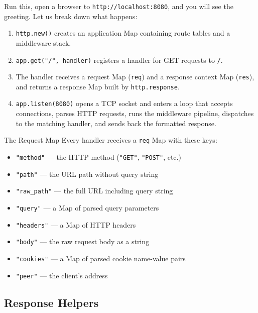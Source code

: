 Run this, open a browser to \texttt{http://localhost:8080}, and you will see the greeting.
Let us break down what happens:

\begin{enumerate}
  \item \lstinline|http.new()| creates an application Map containing route tables and a middleware stack.
  \item \lstinline|app.get("/", handler)| registers a handler for GET requests to \texttt{/}.
  \item The handler receives a request Map (\lstinline|req|) and a response context Map (\lstinline|res|), and returns a response Map built by \lstinline|http.response|.
  \item \lstinline|app.listen(8080)| opens a TCP socket and enters a loop that accepts connections, parses HTTP requests, runs the middleware pipeline, dispatches to the matching handler, and sends back the formatted response.
\end{enumerate}

\begin{defnbox}{The Request Map}
Every handler receives a \lstinline|req| Map with these keys:
\begin{itemize}
  \item \lstinline|"method"| --- the HTTP method (\lstinline|"GET"|, \lstinline|"POST"|, etc.)
  \item \lstinline|"path"| --- the URL path without query string
  \item \lstinline|"raw_path"| --- the full URL including query string
  \item \lstinline|"query"| --- a Map of parsed query parameters
  \item \lstinline|"headers"| --- a Map of HTTP headers
  \item \lstinline|"body"| --- the raw request body as a string
  \item \lstinline|"cookies"| --- a Map of parsed cookie name-value pairs
  \item \lstinline|"peer"| --- the client's address
\end{itemize}
\end{defnbox}

\subsection{Response Helpers}\label{sec:http-response-helpers}


